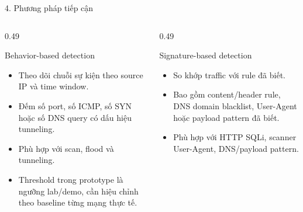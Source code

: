 \documentclass[t, aspectratio=169]{beamer}
\begin{document}
\begin{frame}{4. Phương pháp tiếp cận}
    \begin{columns}[T,onlytextwidth]
        \begin{column}{0.49\textwidth}
            \begin{block}{Behavior-based detection}
                \begin{itemize}
                    \item Theo dõi chuỗi sự kiện theo source IP và time window.
                    \item Đếm số port, số ICMP, số SYN hoặc số DNS query có dấu hiệu tunneling.
                    \item Phù hợp với scan, flood và tunneling.
                    \item Threshold trong prototype là ngưỡng lab/demo, cần hiệu chỉnh theo baseline từng mạng thực tế.
                \end{itemize}
            \end{block}
        \end{column}
        \begin{column}{0.49\textwidth}
            \begin{alertblock}{Signature-based detection}
                \begin{itemize}
                    \item So khớp traffic với rule đã biết.
                    \item Bao gồm content/header rule, DNS domain blacklist, User-Agent hoặc payload pattern đã biết.
                    \item Phù hợp với HTTP SQLi, scanner User-Agent, DNS/payload pattern.
                \end{itemize}
            \end{alertblock}
        \end{column}
    \end{columns}
\end{frame}
\end{document}

